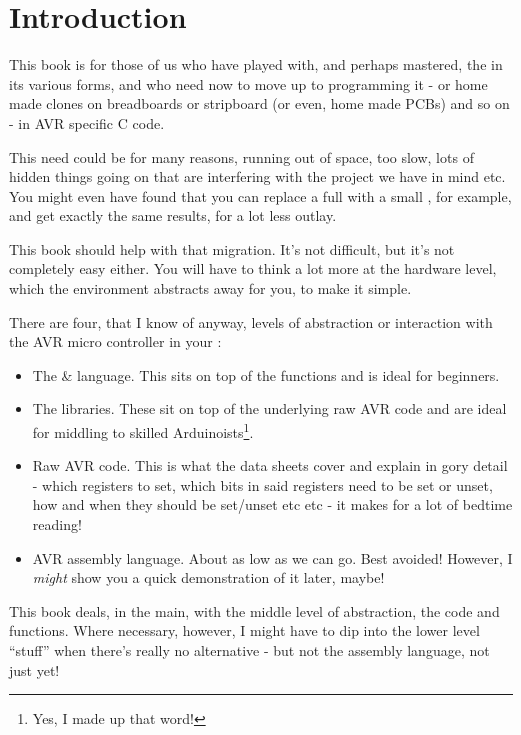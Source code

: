 \chapter{Introduction}\label{introduction}

This book is for those of us who have played with, and perhaps mastered, the  in its various forms, and who need now to move up to programming it - or home made clones on breadboards or stripboard (or even, home made PCBs) and so on - in AVR specific C code.

This need could be for many reasons, running out of space, too slow, lots of hidden things going on that are interfering with the project we have in mind etc. You might even have found that you can replace a full  with a small , for example, and get exactly the same results, for a lot less outlay.

This book should help with that migration. It's not difficult, but it's not completely easy either. You will have to think a lot more at the hardware level, which the   environment abstracts away for you, to make it simple.

There are four, that I know of anyway, levels of abstraction or interaction with the AVR micro controller in your :

\begin{itemize}
	\item The  \& language. This sits on top of the  functions and is ideal for beginners.
	\item The  libraries. These sit on top of the underlying raw AVR code and are ideal for middling to skilled Arduinoists\footnote{Yes, I made up that word!}. 
	\item Raw AVR code. This is what the data sheets cover and explain in gory detail - which registers to set, which bits in said registers need to be set or unset, how and when they should be set/unset etc etc - it makes for a lot of bedtime reading!
	\item AVR assembly language. About as low as we can go. Best avoided! However, I \emph{might} show you a quick demonstration of it later, maybe!
\end{itemize}

This book deals, in the main, with the middle level of abstraction, the  code and functions. Where necessary, however, I might have to dip into the lower level ``stuff'' when there's really no alternative - but not the assembly language, not just yet!

